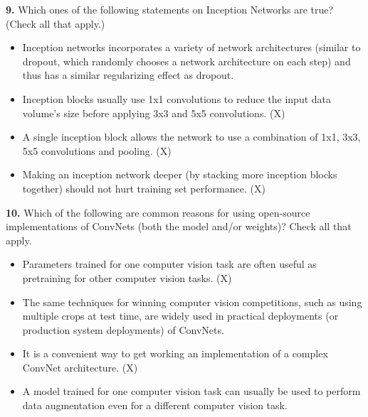 \textbf{9.} Which ones of the following statements on Inception Networks are true? (Check all that apply.)
\begin{itemize}
    \item Inception networks incorporates a variety of network architectures (similar to dropout, which randomly chooses a network architecture on each step) and thus has a similar regularizing effect as dropout.
    \item Inception blocks usually use 1x1 convolutions to reduce the input data volume’s size before applying 3x3 and 5x5 convolutions. (X)
    \item A single inception block allows the network to use a combination of 1x1, 3x3, 5x5 convolutions and pooling. (X)
    \item Making an inception network deeper (by stacking more inception blocks together) should not hurt training set performance. (X)
\end{itemize}
\textbf{10.} Which of the following are common reasons for using open-source implementations of ConvNets (both the model and/or weights)? Check all that apply.
\begin{itemize}
    \item Parameters trained for one computer vision task are often useful as pretraining for other computer vision tasks. (X)
    \item The same techniques for winning computer vision competitions, such as using multiple crops at test time, are widely used in practical deployments (or production system deployments) of ConvNets.
    \item It is a convenient way to get working an implementation of a complex ConvNet architecture. (X)
    \item A model trained for one computer vision task can usually be used to perform data augmentation even for a different computer vision task.
\end{itemize}